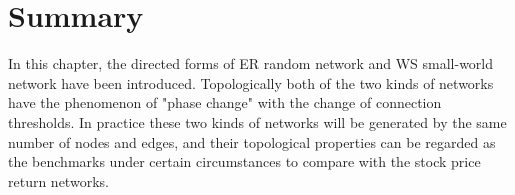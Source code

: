 \section{Summary}
In this chapter, the directed forms of ER random network and WS small-world network have been introduced. Topologically both of the two kinds of networks have the phenomenon of "phase change" with the change of connection thresholds. In practice these two kinds of networks will be generated by the same number of nodes and edges, and their topological properties can be regarded as the benchmarks under certain circumstances to compare with the stock price return networks.
